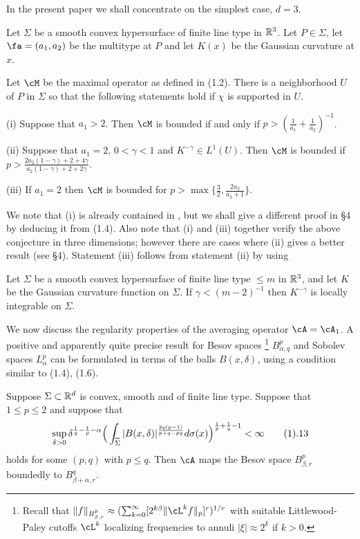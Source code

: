 In the present paper we shall concentrate on the simplest
case, $d=3$.


Let $\Sigma$ be a smooth  convex hypersurface of finite line
type in ${\Bbb R}^3$. Let $P\in \Sigma$, let $\fa=(a_1, a_2)$
be the multitype at $P$ and let $K(x)$ be the Gaussian curvature at $x$.

Let  $\cM$ be the  maximal operator 
as defined in (1.2). There is a neighborhood $U$ of $P$ in $\Sigma$ 
so that the 
following statements hold if $\chi$ is supported in $U$.


(i) Suppose that $a_1>2$.
 Then $\cM$ is bounded 
if and only if $p>(\frac 1{a_1}+\frac 1{a_2})^{-1}$.

(ii) Suppose that $a_1=2$, $0<\gamma<1$ and $K^{-\gamma}\in L^1(U)$.
Then $\cM$ is bounded  if 
$p> \frac{2a_2(1-\gamma)+2+4\gamma}{a_2(1-\gamma)+2+2\gamma}$.

(iii) If $a_1=2$ 
then  $\cM$ is bounded for $p>\max\{\frac 3 2,
\frac {2a_2}{a_2+1}\}$.
\endproclaim


We note that (i) is already contained in \cite{14}, but we shall 
give a different proof in \S4 by deducing it from (1.4).
Also note that (i) and (iii) together verify the 
above conjecture in three dimensions; 
however there are cases where (ii) gives a better result (see \S4).
Statement (iii) follows from statement (ii) by using

Let $\Sigma$ be a smooth  convex hypersurface of finite line
type $\le m$ in $\Bbb R^3$, and let $K$ be the Gaussian curvature function on $\Sigma$.
If $\gamma<(m-2)^{-1}$ then  $K^{-\gamma}$ is locally integrable on $\Sigma$.
\endproclaim

We now discuss
the  regularity properties of the averaging 
operator $\cA=\cA_1$. A positive 
and apparently quite precise result for Besov spaces 
\footnote{\rm Recall that
$\|f\|_{B^p_{\beta,r}}\approx 
(\sum_{k=0}^\infty[2^{k\beta}\|\cL^k f\|_p]^r)^{1/r}$ with
 suitable Littlewood-Paley cutoffs $\cL^k$ localizing frequencies to annuli
$|\xi|\approx 2^k$ if $k>0$.} 
$B^p_{\alpha,q}$ and Sobolev spaces $L^p_\alpha$
 can be 
formulated in terms of the balls $B(x,\delta)$, using a condition similar
to (1.4), (1.6). 


 Suppose  $\Sigma\subset \Bbb R^d$ 
is convex, smooth and  of finite line 
type.
Suppose that $1\le p\le 2$ and suppose that 
$$\sup_{\delta>0} \delta^{\frac 1q-\frac 1p-\alpha}
\Big(\int_\tSi|B(x,\delta)|^{\frac{2q(p-1)}{p+q-pq}}d\sigma(x)
\Big)^{\frac 1p+\frac 1q-1}<\infty
\tag 1.13$$
holds for some $(p,q)$ with $p\le q$.
Then $\cA$ maps the Besov space $B^p_{\beta,r}$ boundedly to 
$B^q_{\beta+\alpha,r}$.


